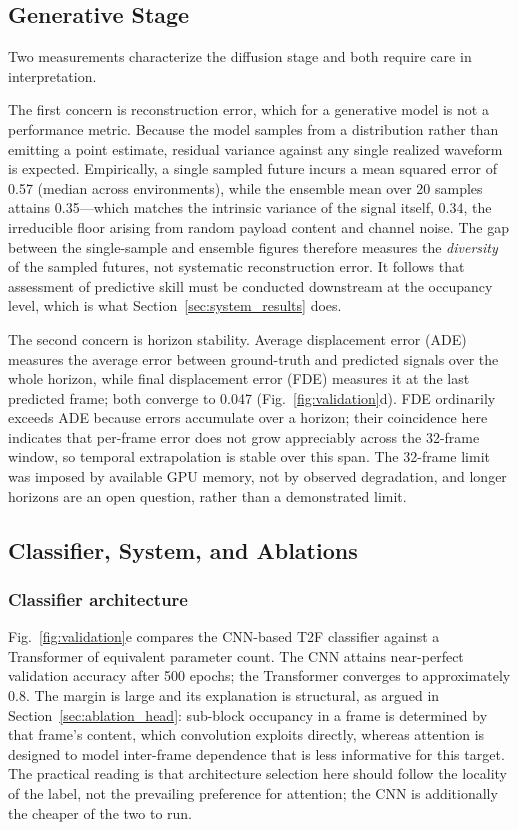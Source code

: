 \documentclass[lettersize,journal]{IEEEtran}
\begin{document}
\subsection{Generative Stage}
Two measurements characterize the diffusion stage and both require care
in interpretation.

The first concern is reconstruction error, which for a generative model is
not a performance metric. Because the model samples from a distribution
rather than emitting a point estimate, residual variance against any
single realized waveform is expected. Empirically, a single sampled
future incurs a mean squared error of 0.57 (median across environments),
while the ensemble mean over 20 samples attains 0.35---which matches the
intrinsic variance of the signal itself, 0.34, the irreducible floor
arising from random payload content and channel noise. The gap between
the single-sample and ensemble figures therefore measures the
\emph{diversity} of the sampled futures, not systematic reconstruction
error. It follows that assessment of predictive skill must be conducted
downstream at the occupancy level, which is what Section~\ref{sec:system_results}
does.

The second concern is horizon stability. Average displacement error (ADE)
measures the average error between ground-truth and predicted signals over the
whole horizon, while final displacement error (FDE) measures it at the last
predicted frame; both converge to 0.047
(Fig.~\ref{fig:validation}d). FDE ordinarily exceeds ADE because errors
accumulate over a horizon; their coincidence here indicates that
per-frame error does not grow appreciably across the 32-frame window, so
temporal extrapolation is stable over this span. The 32-frame limit was
imposed by available GPU memory, not by observed degradation, and longer
horizons are an open question, rather than a demonstrated limit.

\subsection{Classifier, System, and Ablations}
\subsubsection{Classifier architecture}
Fig.~\ref{fig:validation}e compares the CNN-based T2F classifier against
a Transformer of equivalent parameter count. The CNN attains near-perfect
validation accuracy after 500 epochs; the Transformer converges to
approximately 0.8. The margin is large and its explanation is
structural, as argued in Section~\ref{sec:ablation_head}: sub-block occupancy in
a frame is determined by that frame's content, which convolution exploits
directly, whereas attention is designed to model inter-frame dependence that is
less informative for this target. The practical reading is that
architecture selection here should follow the locality of the label, not
the prevailing preference for attention; the CNN is additionally the cheaper of
the two to run.
\end{document}
